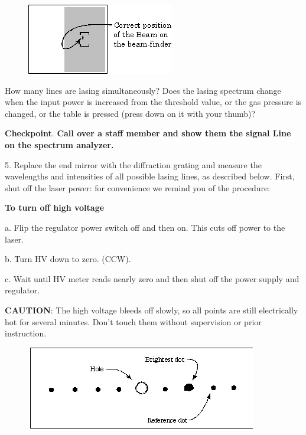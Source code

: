 \documentclass{../lab}
\begin{document}
\begin{figure}[h]
    \centering
    \href{http://experimentationlab.berkeley.edu/sites/default/files/images/CO26.gif}{\includegraphics[width=\linewidth]{images/CO26.png}}
    \caption{}
    \label{fig:CO26}
\end{figure}

How many lines are lasing simultaneously? Does the lasing spectrum change when the input power is increased from the threshold value, or the gas pressure is changed, or the table is pressed (press down on it with your thumb)?

\textbf{Checkpoint}. \textbf{Call over a staff member and show them the signal Line on the spectrum analyzer.}

5. Replace the end mirror with the diffraction grating and measure the wavelengths and intensities of all possible lasing lines, as described below. First, shut off the laser power: for convenience we remind you of the procedure:

\textbf{To turn off high voltage}

a. Flip the regulator power switch off and then on. This cuts off power to the laser.

b. Turn HV down to zero. (CCW).

c. Wait until HV meter reads nearly zero and then shut off the power supply and regulator.

\textbf{CAUTION}: The high voltage bleeds off slowly, so all points are still electrically hot for several minutes. Don't touch them without supervision or prior instruction.


\begin{figure}[h]
    \centering
    \href{http://experimentationlab.berkeley.edu/sites/default/files/images/CO27.gif}{\includegraphics[width=\linewidth]{images/CO27.png}}
    \caption{}
    \label{fig:CO27}
\end{figure}
\end{document}
